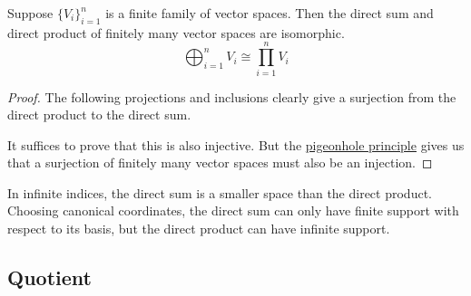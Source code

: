 \begin{theorem}
    Suppose \({\{V_i\}}_{i=1}^n\) is a finite family of vector spaces.
    Then the direct sum and direct product of finitely many vector spaces are isomorphic.
    \begin{equation*}
        \bigoplus_{i=1}^n V_i \cong \prod_{i=1}^n V_i
    \end{equation*}
\end{theorem}
\begin{proof}
    The following projections and inclusions clearly give a surjection
    from the direct product to the direct sum.
    \begin{center}
    \end{center}
    It suffices to prove that this is also injective.
    But the \hyperref[thm:pigeonhole]{pigeonhole principle}
    gives us that a surjection of finitely many vector spaces
    must also be an injection.
\end{proof}

\begin{remark}
    In infinite indices,
    the direct sum is a smaller space than the direct product.
    Choosing canonical coordinates,
    the direct sum can only have finite support with respect to its basis,
    but the direct product can have infinite support.
\end{remark}


\subsection*{Quotient}

